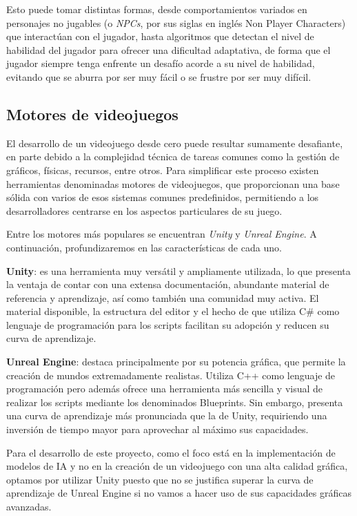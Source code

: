 \documentclass[a4paper]{article}
\begin{document}
Esto puede tomar distintas formas, desde comportamientos variados en personajes no jugables (o \textit{NPCs}, por sus siglas en inglés Non Player Characters) que interactúan con el jugador, hasta algoritmos que detectan el nivel de habilidad del jugador para ofrecer una dificultad adaptativa, de forma que el jugador siempre tenga enfrente un desafío acorde a su nivel de habilidad, evitando que se aburra por ser muy fácil o se frustre por ser muy difícil.

\subsection{Motores de videojuegos}

El desarrollo de un videojuego desde cero puede resultar sumamente desafiante, en parte debido a la complejidad técnica de tareas comunes como la gestión de gráficos, físicas, recursos, entre otros. Para simplificar este proceso existen herramientas denominadas motores de videojuegos, que proporcionan una base sólida con varios de esos sistemas comunes predefinidos, permitiendo a los desarrolladores centrarse en los aspectos particulares de su juego.

Entre los motores más populares se encuentran \textit{Unity} y \textit{Unreal Engine}. A continuación, profundizaremos en las características de cada uno.

\textbf{Unity}: es una herramienta muy versátil y ampliamente utilizada, lo que presenta la ventaja de contar con una extensa documentación, abundante material de referencia y aprendizaje, así como también una comunidad muy activa. El material disponible, la estructura del editor y el hecho de que utiliza C\# como lenguaje de programación para los scripts facilitan su adopción y reducen su curva de aprendizaje.

\textbf{Unreal Engine}: destaca principalmente por su potencia gráfica, que permite la creación de mundos extremadamente realistas. Utiliza C++ como lenguaje de programación pero además ofrece una herramienta más sencilla y visual de realizar los scripts mediante los denominados Blueprints.
Sin embargo, presenta una curva de aprendizaje más pronunciada que la de Unity, requiriendo una inversión de tiempo mayor para aprovechar al máximo sus capacidades.

Para el desarrollo de este proyecto, como el foco está en la implementación de modelos de IA y no en la creación de un videojuego con una alta calidad gráfica, optamos por utilizar Unity puesto que no se justifica superar la curva de aprendizaje de Unreal Engine si no vamos a hacer uso de sus capacidades gráficas avanzadas.
\end{document}
